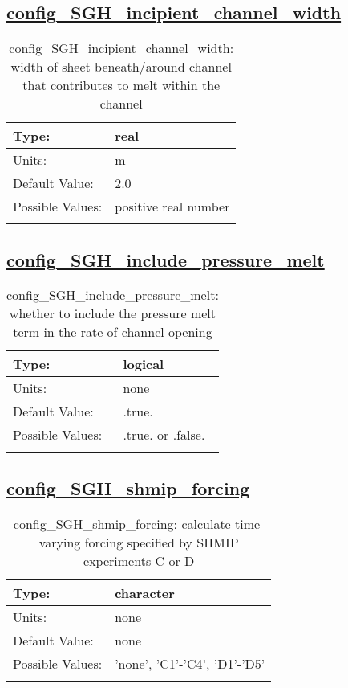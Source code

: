 \subsection[config\_SGH\_incipient\_channel\_width]{\hyperref[sec:nm_tab_subglacial_hydro]{config\_SGH\_incipient\_channel\_width}}
\label{subsec:nm_sec_config_SGH_incipient_channel_width}
\begin{center}
\begin{longtable}{| p{2.0in} || p{4.0in} |}
    \hline
    Type: & real \\
    \hline
    Units: & \si{m} \\
    \hline
    Default Value: & 2.0 \\
    \hline
    Possible Values: & positive real number \\
    \hline
    \caption{config\_SGH\_incipient\_channel\_width: width of sheet beneath/around channel that contributes to melt within the channel}
\end{longtable}
\end{center}
\subsection[config\_SGH\_include\_pressure\_melt]{\hyperref[sec:nm_tab_subglacial_hydro]{config\_SGH\_include\_pressure\_melt}}
\label{subsec:nm_sec_config_SGH_include_pressure_melt}
\begin{center}
\begin{longtable}{| p{2.0in} || p{4.0in} |}
    \hline
    Type: & logical \\
    \hline
    Units: & \si{none} \\
    \hline
    Default Value: & .true. \\
    \hline
    Possible Values: & .true. or .false. \\
    \hline
    \caption{config\_SGH\_include\_pressure\_melt: whether to include the pressure melt term in the rate of channel opening}
\end{longtable}
\end{center}
\subsection[config\_SGH\_shmip\_forcing]{\hyperref[sec:nm_tab_subglacial_hydro]{config\_SGH\_shmip\_forcing}}
\label{subsec:nm_sec_config_SGH_shmip_forcing}
\begin{center}
\begin{longtable}{| p{2.0in} || p{4.0in} |}
    \hline
    Type: & character \\
    \hline
    Units: & \si{none} \\
    \hline
    Default Value: & none \\
    \hline
    Possible Values: & 'none', 'C1'-'C4', 'D1'-'D5' \\
    \hline
    \caption{config\_SGH\_shmip\_forcing: calculate time-varying forcing specified by SHMIP experiments C or D}
\end{longtable}
\end{center}
